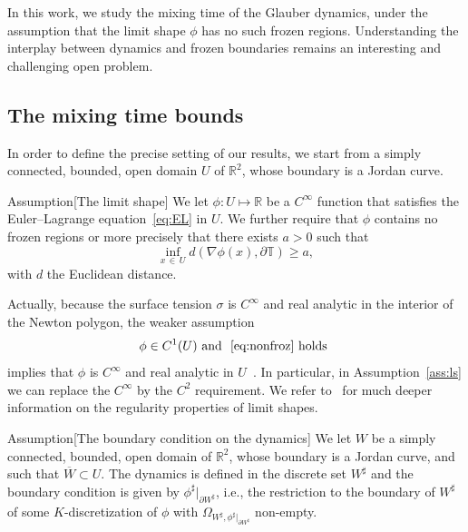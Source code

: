 \documentclass[AHL,Unicode,longabstracts,published]{cedram}
\newcommand{\R}{\mathbb{R}}
\newcommand{\bbT}{\mathbb{T}}
\renewcommand{\d}{{\sharp }}
\begin{document}
In this work, we study the mixing time of the Glauber dynamics, under the assumption that the limit shape $\phi$ has no such frozen regions. Understanding the interplay between dynamics and frozen boundaries remains an interesting and challenging open problem.

\subsection{The mixing time bounds}

In order to define the precise setting of our results, we start from a simply connected, bounded, open domain $U$ of $\R^2$, whose boundary is a Jordan curve.

\begin{enonce}
{Assumption}[The limit shape]\label{ass:ls}
We let $\phi:U\mapsto \R$ be a $C^\infty$ function that satisfies the Euler--Lagrange equation~\eqref{eq:EL} in $U$. We further require that $\phi$ contains no frozen regions or more precisely that there exists $a>0$ such that
\begin{equation}\label{eq:nonfroz}
\inf_{x\,\in\,U}d(\nabla\phi(x),\partial\bbT)\ge a,
\end{equation}
with $d$ the Euclidean distance.
\end{enonce}

Actually, because the surface tension $\sigma$ is $C^\infty$ and real analytic in the interior of the Newton polygon, the weaker assumption
\begin{equation}\label{eq:weaker}
\phi\in C^1(U) \text{ and }~\eqref{eq:nonfroz} \text{ holds }
\end{equation}
implies that $\phi$ is $C^\infty$ and real analytic in $U$~\cite[Sec.~VI.3]{Giaquinta}. In particular, in Assumption~\ref{ass:ls} we can replace the $C^\infty$ by the $C^2$ requirement. We refer to~\cite{Duse} for much deeper information on the regularity properties of limit shapes.


\begin{enonce}{Assumption}[The boundary condition on the dynamics]\label{assu:W}
We let $W$ be a simply connected, bounded, open domain of $\R^2$, whose boundary is a Jordan curve, and such that $\overline W\subset U$. The dynamics is defined in the discrete set $W^\d$ and the boundary condition is given by $\phi^\d|_{\partial W^\d}$, i.e., the restriction to the boundary of $W^\d$ of some $K$-discretization of $\phi$ with $\Omega_{W^\d,\phi^\d|_{\partial W^\d}}$ non-empty.
\end{enonce}
\end{document}
